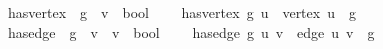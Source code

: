 \isamarkupfalse%
\ has{\isacharunderscore}{\kern0pt}vertex\ {\isacharcolon}{\kern0pt}{\isacharcolon}{\kern0pt}\ {\isachardoublequoteopen}{\isacharprime}{\kern0pt}g\ {\isasymRightarrow}\ {\isacharprime}{\kern0pt}v\ {\isasymRightarrow}\ bool{\isachardoublequoteclose}\ \ \isanewline
\ \ {\isachardoublequoteopen}has{\isacharunderscore}{\kern0pt}vertex\ g\ u\ {\isasymequiv}\ vertex\ u\ {\isasymsqsubseteq}\ g{\isachardoublequoteclose}\isanewline
\isanewline
{}\isamarkupfalse%
\ has{\isacharunderscore}{\kern0pt}edge\ {\isacharcolon}{\kern0pt}{\isacharcolon}{\kern0pt}\ {\isachardoublequoteopen}{\isacharprime}{\kern0pt}g\ {\isasymRightarrow}\ {\isacharprime}{\kern0pt}v\ {\isasymRightarrow}\ {\isacharprime}{\kern0pt}v\ {\isasymRightarrow}\ bool{\isachardoublequoteclose}\ \ \isanewline
\ \ {\isachardoublequoteopen}has{\isacharunderscore}{\kern0pt}edge\ g\ u\ v\ {\isasymequiv}\ edge\ u\ v\ {\isasymsqsubseteq}\ g{\isachardoublequoteclose}
